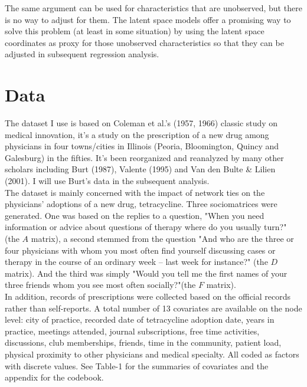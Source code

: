\documentclass[11pt]{article}
\begin{document}
The same argument can be used for characteristics that are unobserved, but there is no way to adjust for them. The latent space models offer a promising way to solve this problem (at least in some situation) by using the latent space coordinates as proxy for those unobserved characteristics so that they can be adjusted in subsequent regression analysis.\\

\section{Data}

The dataset I use is based on Coleman et al.'s (1957, 1966) classic study on medical innovation, it's a study on the prescription of a new drug among physicians in four towns/cities in Illinois (Peoria, Bloomington, Quincy and Galesburg) in the fifties. It's been reorganized and reanalyzed by many other scholars including Burt (1987), Valente (1995) and Van den Bulte \& Lilien (2001). I will use Burt's data in the subsequent analysis.\\

The dataset is mainly concerned with the impact of network ties on the physicians' adoptions of a new drug, tetracycline. Three sociomatrices were generated. One was based on the replies to a question, "When you need information or advice about questions of therapy where do you usually turn?" (the $A$ matrix), a second stemmed from the question "And who are the three or four physicians with whom you most often find yourself discussing cases or therapy in the course of an ordinary week -- last week for instance?" (the $D$ matrix). And the third was simply "Would you tell me the first names of your three friends whom you see most often socially?"(the $F$ matrix).\\

In addition, records of prescriptions were collected based on the official records rather than self-reports. A total number of 13 covariates are available on the node level: city of practice, recorded date of tetracycline adoption date, years in practice, meetings attended, journal subscriptions, free time activities, discussions, club memberships, friends, time in the community, patient load, physical proximity to other physicians and medical specialty. All coded as factors with discrete values. See Table-1 for the summaries of covariates and the appendix for the codebook.\\
\end{document}
